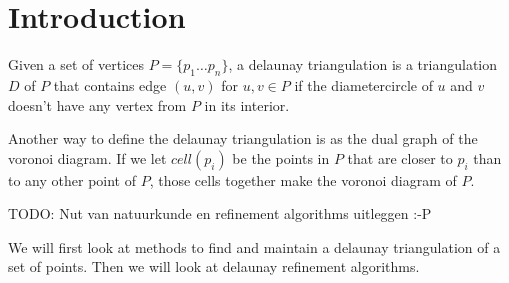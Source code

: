 \section{Introduction}
\label{sec:introduction}

Given a set of vertices $P = \{p_1 \ldots p_n\}$, a delaunay triangulation is a triangulation $D$ of $P$
that contains edge $(u, v)$ for $u, v \in P$ if the diametercircle of $u$ and $v$ doesn't have any vertex from $P$ in its interior.


Another way to define the delaunay triangulation is as the dual graph of the voronoi diagram.
If we let $cell(p_i)$ be the points in $P$ that are closer to $p_i$ than to any other point of $P$,
those cells together make the voronoi diagram of $P$.

TODO: Nut van natuurkunde en refinement algorithms uitleggen :-P

We will first look at methods to find and maintain a delaunay triangulation of a set of points.
Then we will look at delaunay refinement algorithms.

